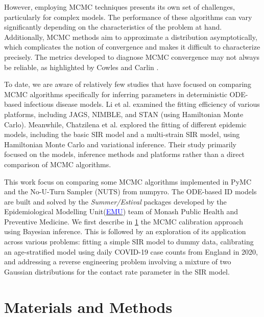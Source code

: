\documentclass[nonatbib,preprint,12pt,authoryear]{elsarticle}
\begin{document}
However, employing MCMC techniques presents its own set of challenges, particularly for complex models. The performance of these algorithms can vary significantly depending on the characteristics of the problem at hand. Additionally, MCMC methods aim to approximate a distribution asymptotically, which complicates the notion of convergence and makes it difficult to characterize precisely. The metrics developed to diagnose MCMC convergence may not always be reliable, as highlighted by Cowles and Carlin \cite{cowles_markov_1996}.

To date, we are aware of relatively few studies that have focused on comparing MCMC algorithms specifically for inferring parameters in deterministic ODE-based infectious disease models. Li et al. \cite{li_fitting_2018} examined the fitting efficiency of various platforms, including JAGS, NIMBLE, and STAN (using Hamiltonian Monte Carlo). Meanwhile, Chatzilena et al. \cite{chatzilena_contemporary_2019} explored the fitting of different epidemic models, including the basic SIR model and a multi-strain SIR model, using Hamiltonian Monte Carlo and variational inference. Their study primarily focused on the models, inference methods and platforms rather than a direct comparison of MCMC algorithms.

This work focus on comparing some MCMC algorithms implemented in PyMC and the No-U-Turn Sampler (NUTS) from numpyro. The ODE-based ID models are built and solved by the \textit{Summer/Estival} packages developed by the Epidemiological Modelling Unit(\href{https://www.monash.edu/medicine/sphpm/units/epidemiological-modelling}{\textcolor{blue}{EMU}}) team of Monash Public Health and Preventive Medicine.
We first describe in \ref{sec:Material_Methods} the MCMC calibration approach using Bayesian inference. This is followed by an exploration of its application across various problems: fitting a simple SIR model to dummy data, calibrating an age-stratified model using daily COVID-19 case counts from England in 2020, and addressing a reverse engineering problem involving a mixture of two Gaussian distributions for the contact rate parameter in the SIR model.

\section{Materials and Methods}
\label{sec:Material_Methods}
\end{document}
